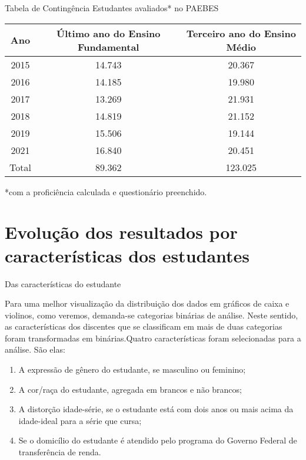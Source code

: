 \documentclass[
  ignorenonframetext,
]{beamer}
\providecommand{\tightlist}{%
  \setlength{\itemsep}{0pt}\setlength{\parskip}{0pt}}
\begin{document}
\begin{frame}{Tabela de Contingência}
\protect\hypertarget{tabela-de-continguxeancia-1}{}
Estudantes avaliados* no PAEBES

\begin{longtable}[]{@{}ccc@{}}
\toprule()
Ano & Último ano do Ensino Fundamental & Terceiro ano do Ensino Médio \\
\midrule()
\endhead
2015 & 14.743 & 20.367 \\
2016 & 14.185 & 19.980 \\
2017 & 13.269 & 21.931 \\
2018 & 14.819 & 21.152 \\
2019 & 15.506 & 19.144 \\
2021 & 16.840 & 20.451 \\
Total & 89.362 & 123.025 \\
\bottomrule()
\end{longtable}

*com a proficiência calculada e questionário preenchido.
\end{frame}

\hypertarget{evoluuxe7uxe3o-dos-resultados-por-caracteruxedsticas-dos-estudantes}{%
\section{Evolução dos resultados por características dos
estudantes}\label{evoluuxe7uxe3o-dos-resultados-por-caracteruxedsticas-dos-estudantes}}

\begin{frame}
Das características do estudante

Para uma melhor visualização da distribuição dos dados em gráficos de
caixa e violinos, como veremos, demanda-se categorias binárias de
análise. Neste sentido, as características dos discentes que se
classificam em mais de duas categorias foram transformadas em
binárias.Quatro características foram selecionadas para a análise. São
elas:

\begin{enumerate}[<+->]
\tightlist
\item
  A expressão de gênero do estudante, se masculino ou feminino;
\item
  A cor/raça do estudante, agregada em brancos e não brancos;
\item
  A distorção idade-série, se o estudante está com dois anos ou mais
  acima da idade-ideal para a série que cursa;
\item
  Se o domicílio do estudante é atendido pelo programa do Governo
  Federal de transferência de renda.
\end{enumerate}
\end{frame}
\end{document}
